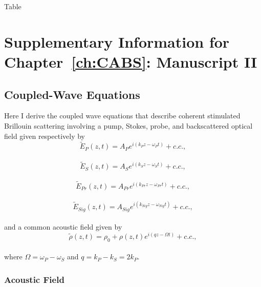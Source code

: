 Table~\doublespacing
\chapter{Supplementary Information for Chapter~\ref{ch:CABS}: Manuscript II}
\label{appendix: CABS}
\acresetall


\section{Coupled-Wave Equations}
\label{Appendix:Coupled-Wave Equations}

Here I derive the coupled wave equations that describe coherent stimulated Brillouin scattering involving a pump, Stokes, probe, and backscattered optical field given respectively by
\\
\begin{equation}
    \tilde{E}_{P}(z,t) = A_{P}e^{i(k_{P}z - \omega_{P}t)} + c.c.,
    \label{eq:Pump optical field}
\end{equation}
\\
\begin{equation}
    \tilde{E}_{S}(z,t) = A_{S}e^{i(k_{S}z - \omega_{S}t)} + c.c.,
    \label{eq:Stokes optical field}
\end{equation}
\\
\begin{equation}
    \tilde{E}_{Pr}(z,t) = A_{Pr}e^{i(k_{Pr}z - \omega_{Pr}t)} + c.c.,
    \label{eq:Probe optical field}
\end{equation}
\\
\begin{equation}
    \tilde{E}_{Sig}(z,t) = A_{Sig}e^{i(k_{Sig}z - \omega_{Sig}t)} + c.c.,
    \label{eq:Signal optical field}
\end{equation}
\\
\noindent and a common acoustic field given by
\\
\begin{equation}
    \tilde{\rho}(z,t) = \rho_{0} + \rho(z,t)e^{i(qz - \Omega t)} + c.c.,
    \label{eq:acoustic field}
\end{equation}
\\
\noindent where \(\Omega = \omega_{P} - \omega_{S}\) and \(q = k_{P} - k_{S} = 2k_{P}\).


\subsection{Acoustic Field}
\label{Coupled-Wave Equations:Acoustic Field}

